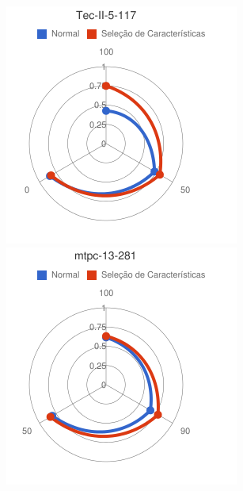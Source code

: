 \begin{figure}
\begin{minipage}{.3\textwidth}
\end{minipage}%
\begin{minipage}{.3\textwidth}
  \centering
  \includegraphics[width=\linewidth]{img/red-ufes-moodle/image5.png}
\end{minipage} %
\begin{minipage}{.3\textwidth}
  \centering
  \includegraphics[width=\linewidth]{img/red-ufes-moodle/image6.png}

\end{minipage}
\end{figure}
